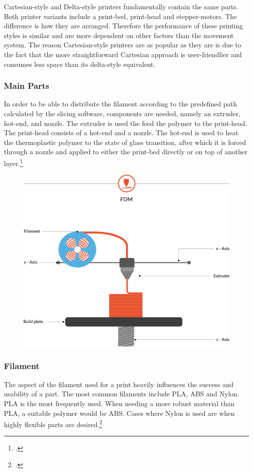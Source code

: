 Cartesian-style and Delta-style printers fundamentally contain the same parts. Both printer variants include a print-bed, print-head and stepper-motors. The difference is how they are arranged. Therefore the performance of these printing styles is similar and are more dependent on other factors than the movement system. The reason Cartesian-style printers are as popular as they are is due to the fact that the more straightforward Cartesian approach is user-friendlier and consumes less space than its delta-style equivalent.\newline

\subsubsection{Main Parts}

In order to be able to distribute the filament according to the predefined path calculated by the slicing software, components are needed, namely an extruder, hot-end, and nozzle. The extruder is used the feed the polymer to the print-head. The print-head consists of a hot-end and a nozzle. The hot-end is used to heat the thermoplastic polymer to the state of glass transition, after which it is forced through a nozzle and applied to either the print-bed directly or on top of another layer.\footcite{all3dpFDM3DPrinting2020}


\begin{figure}[h]
	\centering
	\includegraphics[width=0.5\linewidth]{img/FDM_Principle}
	\caption{}
	\label{fig:custom_parts_fdm_parts}
\end{figure}

\subsubsection{Filament}

The aspect of the filament used for a print heavily influences the success and usability of a part. The most common filaments include PLA, ABS and Nylon. PLA is the most frequently used. When needing a more robust material than PLA, a suitable polymer would be ABS. Cases where Nylon is used are when highly flexible parts are desired.\footcite{hubsIntroToFDM3DPrintingNoDate}


